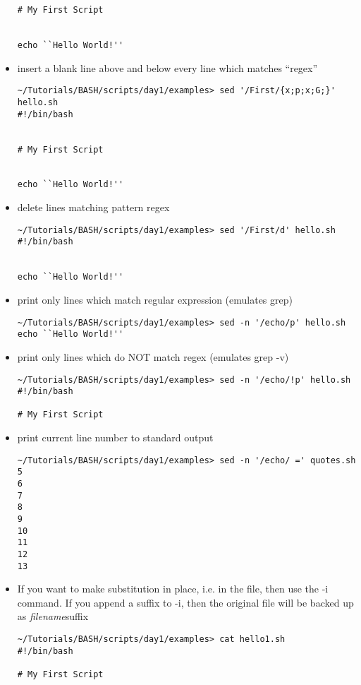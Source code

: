 \documentclass[10pt,t]{beamer}
\begin{document}
\begin{frame}
\begin{itemize}
\begin{lstlisting}[style=LINUX]
# My First Script


echo ``Hello World!''
        \end{lstlisting}
      \item insert a blank line above and below every line which matches ``regex''
        \begin{lstlisting}[style=LINUX]
~/Tutorials/BASH/scripts/day1/examples> sed '/First/{x;p;x;G;}' hello.sh 
#!/bin/bash


# My First Script


echo ``Hello World!''
        \end{lstlisting}
        \framebreak
    \item delete lines matching pattern regex
      \begin{lstlisting}[style=LINUX]
~/Tutorials/BASH/scripts/day1/examples> sed '/First/d' hello.sh 
#!/bin/bash


echo ``Hello World!''
      \end{lstlisting}
    \item print only lines which match regular expression (emulates grep)
      \begin{lstlisting}[style=LINUX]
~/Tutorials/BASH/scripts/day1/examples> sed -n '/echo/p' hello.sh
echo ``Hello World!''
      \end{lstlisting}
    \item print only lines which do NOT match regex (emulates grep -v)
      \begin{lstlisting}[style=LINUX]
~/Tutorials/BASH/scripts/day1/examples> sed -n '/echo/!p' hello.sh
#!/bin/bash

# My First Script

      \end{lstlisting}
    \item print current line number to standard output
      \begin{lstlisting}[style=LINUX]
~/Tutorials/BASH/scripts/day1/examples> sed -n '/echo/ =' quotes.sh 
5
6
7
8
9
10
11
12
13
      \end{lstlisting}
    \item If you want to make substitution in place, i.e. in the file, then use the -i command. If you append a suffix to -i, then the original file will be backed up as \textit{filename}suffix
      \begin{lstlisting}[style=LINUX,basicstyle=\fontsize{4}{5}\selectfont\ttfamily]
~/Tutorials/BASH/scripts/day1/examples> cat hello1.sh
#!/bin/bash

# My First Script


\end{lstlisting}
\end{itemize}
\end{frame}
\end{document}
